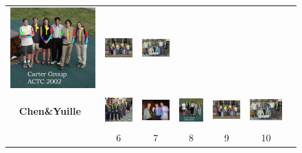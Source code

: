 \begin{figure}
\begin{tabular}{c c c c c c c}
    \includegraphics[height=0.145\linewidth]{imgidx_0079_sticks_waf.pdf}&
    \includegraphics[height=0.145\linewidth]{imgidx_0007_sticks_waf.pdf}&
    \includegraphics[height=0.145\linewidth]{imgidx_0124_sticks_waf.pdf}\\
    \begin{sideways}\bf \small Chen\&Yuille~\cite{Chen:2015:POC}\end{sideways}&
    \includegraphics[height=0.145\linewidth]{imgidx_0114_sticks_chen_waf.pdf}&
    \includegraphics[height=0.145\linewidth]{imgidx_0050_sticks_chen_waf.pdf}&
    \includegraphics[height=0.145\linewidth]{imgidx_0079_sticks_chen_waf.pdf}& 
    \includegraphics[height=0.145\linewidth]{imgidx_0007_sticks_chen_waf.pdf}& 
    \includegraphics[height=0.145\linewidth]{imgidx_0124_sticks_chen_waf.pdf}\\
    &6&7&8&9&10\\
  \end{tabular}


\end{figure}
